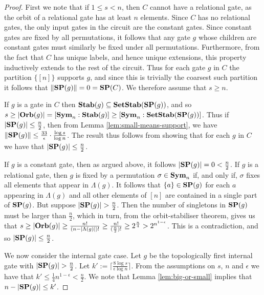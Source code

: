 \documentclass[../paper.tex]{subfiles}
\begin{document}
\begin{proof}
  First we note that if $1 \leq s < n$, then $C$ cannot have a relational gate,
  as the orbit of a relational gate has at least $n$ elements. Since $C$ has no
  relational gates, the only input gates in the circuit are the constant gates.
  Since constant gates are fixed by all permutations, it follows that any gate
  $g$ whose children are constant gates must similarly be fixed under all
  permutations. Furthermore, from the fact that $C$ has unique labels, and hence
  unique extensions, this property inductively extends to the rest of the
  circuit. Thus for each gate $g$ in $C$ the partition $\{[n]\}$ supports $g$,
  and since this is trivially the coarsest such partition it follows that $\|
  \text{\textbf{SP}}(g) \| = 0 = \text{\textbf{SP}}(C)$. We therefore assume that $s \geq n$.

  If $g$ is a gate in $C$ then $\text{\textbf{Stab}} (g) \subseteq \text{\textbf{SetStab}}(\text{\textbf{SP}}(g))$, and so $s
  \geq \vert \text{\textbf{Orb}}(g) \vert = [\text{\textbf{Sym}}_n : \text{\textbf{Stab}}(g)] \geq [\text{\textbf{Sym}}_n :
  \text{\textbf{SetStab}}(\text{\textbf{SP}}(g))]$. Thus if $\vert \text{\textbf{SP}}(g) \vert \leq \frac{n}{2}$, then from
  Lemma \ref{lem:small-means-support}, we have $\| \text{\textbf{SP}} (g) \| \leq
  \frac{33}{\epsilon} \cdot \frac{\log s} {\log n}$. The result thus follows
  from showing that for each $g$ in $C$ we have that $\vert \text{\textbf{SP}} (g) \vert \leq
  \frac{n}{2}$.
  
  If $g$ is a constant gate, then as argued above, it follows $\vert \text{\textbf{SP}}(g)
  \vert = 0 < \frac{n}{2}$. If $g$ is a relational gate, then $g$ is fixed by a
  permutation $\sigma \in \text{\textbf{Sym}}_n$ if, and only if, $\sigma$ fixes all elements
  that appear in $\Lambda(g)$. It follows that $\{a\} \in \text{\textbf{SP}}(g)$ for each $a$
  appearing in $\Lambda(g)$ and all other elements of $[n]$ are contained in a
  single part of $\text{\textbf{SP}}(g)$. But suppose $\vert \text{\textbf{SP}}(g) \vert > \frac{n}{2}$. Then
  the number of singletons in $\text{\textbf{SP}}(g)$ must be larger than $\frac{n}{2}$, which
  in turn, from the orbit-stabiliser theorem, gives us that $ s \geq \vert \text{\textbf{Orb}}
  (g) \vert \geq \frac{n!}{(n-\vert \Lambda (g) \vert)!} \geq
  \frac{n!}{{(\frac{n}{2}})!} \geq 2^{\frac{n}{4}} > 2^{n^{1- \epsilon}} $. This
  is a contradiction, and so $\vert \text{\textbf{SP}}(g) \vert \leq \frac{n}{2}$.

  We now consider the internal gate case. Let $g$ be the topologically first
  internal gate with $\vert \text{\textbf{SP}}(g) \vert > \frac{n}{2}$. Let $k' := \lceil
  \frac{8 \log s}{\epsilon \log n} \rceil$. From the assumptions on $s$, $ n$
  and $\epsilon$ we have that $k' \leq \frac{1}{4}n^{1-\epsilon} < \frac{n}{2}$.
  We note that Lemma \ref{lem:big-or-small} implies that $n - \vert \text{\textbf{SP}}(g) \vert
  \leq k'$.
  

\end{proof}
\end{document}
